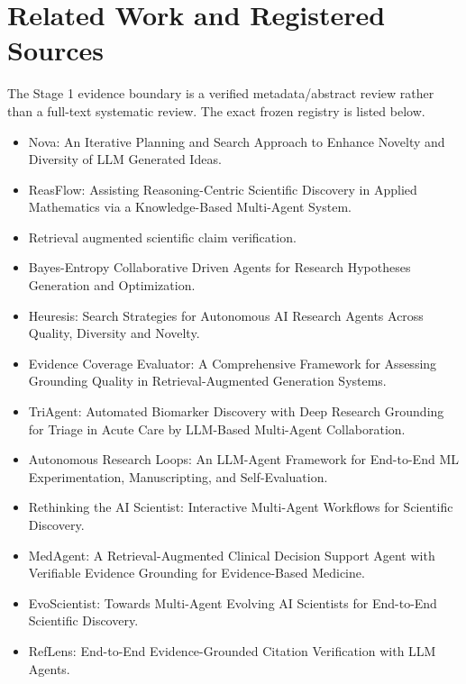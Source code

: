 \documentclass[11pt]{article}
\begin{document}
\section{Related Work and Registered Sources}
The Stage 1 evidence boundary is a verified metadata/abstract review rather than a full-text systematic review. The exact frozen registry is listed below.
\begin{itemize}[leftmargin=*]
\item \cite{paper-2a1fa8b99c181771} Nova: An Iterative Planning and Search Approach to Enhance Novelty and Diversity of LLM Generated Ideas.
\item \cite{paper-2a7771f1bcf8adb2} ReasFlow: Assisting Reasoning-Centric Scientific Discovery in Applied Mathematics via a Knowledge-Based Multi-Agent System.
\item \cite{paper-35ad838f0ac171a7} Retrieval augmented scientific claim verification.
\item \cite{paper-3b6399a19264a862} Bayes-Entropy Collaborative Driven Agents for Research Hypotheses Generation and Optimization.
\item \cite{paper-49947e5b991037d5} Heuresis: Search Strategies for Autonomous AI Research Agents Across Quality, Diversity and Novelty.
\item \cite{paper-69c6e5faa8ef37c2} Evidence Coverage Evaluator: A Comprehensive Framework for Assessing Grounding Quality in Retrieval-Augmented Generation Systems.
\item \cite{paper-6c621b0f059e2d3d} TriAgent: Automated Biomarker Discovery with Deep Research Grounding for Triage in Acute Care by LLM-Based Multi-Agent Collaboration.
\item \cite{paper-8259991dea6aaecd} Autonomous Research Loops: An LLM-Agent Framework for End-to-End ML Experimentation, Manuscripting, and Self-Evaluation.
\item \cite{paper-879e6a747eb8ceb6} Rethinking the AI Scientist: Interactive Multi-Agent Workflows for Scientific Discovery.
\item \cite{paper-96217ebf4f10bd68} MedAgent: A Retrieval-Augmented Clinical Decision Support Agent with Verifiable Evidence Grounding for Evidence-Based Medicine.
\item \cite{paper-965b07ca55b0b420} EvoScientist: Towards Multi-Agent Evolving AI Scientists for End-to-End Scientific Discovery.
\item \cite{paper-e48872d23c4d9e23} RefLens: End-to-End Evidence-Grounded Citation Verification with LLM Agents.
\end{itemize}
\end{document}
